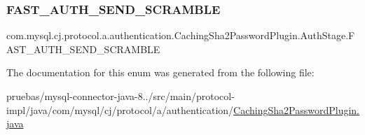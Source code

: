 \subsubsection{\texorpdfstring{F\+A\+S\+T\+\_\+\+A\+U\+T\+H\+\_\+\+S\+E\+N\+D\+\_\+\+S\+C\+R\+A\+M\+B\+LE}{FAST\_AUTH\_SEND\_SCRAMBLE}}
{\footnotesize\ttfamily com.\+mysql.\+cj.\+protocol.\+a.\+authentication.\+Caching\+Sha2\+Password\+Plugin.\+Auth\+Stage.\+F\+A\+S\+T\+\_\+\+A\+U\+T\+H\+\_\+\+S\+E\+N\+D\+\_\+\+S\+C\+R\+A\+M\+B\+LE}



The documentation for this enum was generated from the following file\+:\begin{DoxyCompactItemize}
\item 
pruebas/mysql-\/connector-\/java-\/8../src/main/protocol-\/impl/java/com/mysql/cj/protocol/a/authentication/\mbox{\hyperlink{_caching_sha2_password_plugin_8java}{Caching\+Sha2\+Password\+Plugin.\+java}}\end{DoxyCompactItemize}
